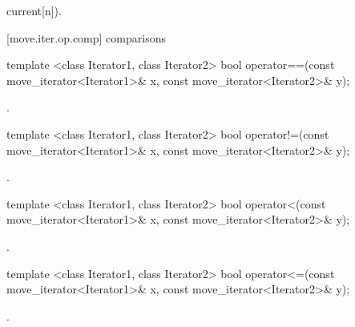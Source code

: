 \begin{itemdescr}
\pnum
\returns {}current[n]).
\end{itemdescr}

[move.iter.op.comp]{ comparisons}

%
%
\begin{itemdecl}
template <class Iterator1, class Iterator2>
bool operator==(const move_iterator<Iterator1>& x, const move_iterator<Iterator2>& y);
\end{itemdecl}

\begin{itemdescr}
\pnum
\returns {}.
\end{itemdescr}

%
%
\begin{itemdecl}
template <class Iterator1, class Iterator2>
bool operator!=(const move_iterator<Iterator1>& x, const move_iterator<Iterator2>& y);
\end{itemdecl}

\begin{itemdescr}
\pnum
\returns {}.
\end{itemdescr}

%
%
\begin{itemdecl}
template <class Iterator1, class Iterator2>
bool operator<(const move_iterator<Iterator1>& x, const move_iterator<Iterator2>& y);
\end{itemdecl}

\begin{itemdescr}
\pnum
\returns {}.
\end{itemdescr}

%
%
\begin{itemdecl}
template <class Iterator1, class Iterator2>
bool operator<=(const move_iterator<Iterator1>& x, const move_iterator<Iterator2>& y);
\end{itemdecl}

\begin{itemdescr}
\pnum
\returns {}.
\end{itemdescr}

